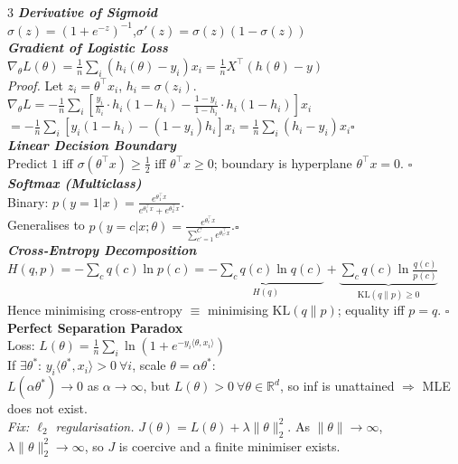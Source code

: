 \documentclass[a4paper,7pt]{article}
\begin{document}
\begin{multicols*}{3}
\textit{\textbf{Derivative of Sigmoid}}\\
$\sigma(z)=(1+e^{-z})^{-1}$,\quad $\sigma'(z)=\sigma(z)(1-\sigma(z))$\\

\textit{\textbf{Gradient of Logistic Loss}}\\
$\nabla_\theta L(\theta)=\frac{1}{n}\sum_i(h_i(\theta)-y_i)x_i=\frac{1}{n}X^\top(h(\theta)-y)$\\
\textit{Proof.} Let $z_i=\theta^\top x_i$, $h_i=\sigma(z_i)$.\\
$\nabla_\theta L=-\frac{1}{n}\sum_i\!\left[\frac{y_i}{h_i}\cdot h_i(1-h_i)-\frac{1-y_i}{1-h_i}\cdot h_i(1-h_i)\right]x_i$\\
$=-\frac{1}{n}\sum_i[y_i(1-h_i)-(1-y_i)h_i]x_i=\frac{1}{n}\sum_i(h_i-y_i)x_i$\hfill$\square$\\

\textit{\textbf{Linear Decision Boundary}}\\
Predict $1$ iff $\sigma(\theta^\top x)\geq\tfrac{1}{2}$ iff $\theta^\top x\geq 0$; boundary is hyperplane $\theta^\top x=0$. \hfill$\square$\\

\textit{\textbf{Softmax (Multiclass)}}\\
Binary: $p(y=1|x)=\frac{e^{\theta_1^\top x}}{e^{\theta_1^\top x}+e^{\theta_2^\top x}}$. \\
Generalises to $p(y=c|x;\theta)=\frac{e^{\theta_c^\top x}}{\sum_{c'=1}^C e^{\theta_{c'}^\top x}}$.\hfill$\square$\\

\textit{\textbf{Cross-Entropy Decomposition}}\\
$H(q,p)=-\sum_c q(c)\ln p(c)=\underbrace{-\sum_c q(c)\ln q(c)}_{H(q)}+\underbrace{\sum_c q(c)\ln\frac{q(c)}{p(c)}}_{\mathrm{KL}(q\|p)\geq 0}$\\
Hence minimising cross-entropy $\equiv$ minimising $\mathrm{KL}(q\|p)$; equality iff $p=q$. \hfill$\square$\\

\textbf{Perfect Separation Paradox}\\
Loss: $L(\theta)=\frac{1}{n}\sum_i\ln(1+e^{-y_i\langle\theta,x_i\rangle})$\\
If $\exists\theta^*$: $y_i\langle\theta^*,x_i\rangle>0\ \forall i$, scale $\theta=\alpha\theta^*$:\\
$L(\alpha\theta^*)\to 0$ as $\alpha\to\infty$, but $L(\theta)>0\ \forall\theta\in\mathbb{R}^d$, so inf is unattained $\Rightarrow$ MLE does not exist.\\
\textit{Fix: $\ell_2$ regularisation.} $J(\theta)=L(\theta)+\lambda\|\theta\|_2^2$. As $\|\theta\|\to\infty$, $\lambda\|\theta\|_2^2\to\infty$, so $J$ is coercive and a finite minimiser exists.\\


\end{multicols*}
\end{document}
